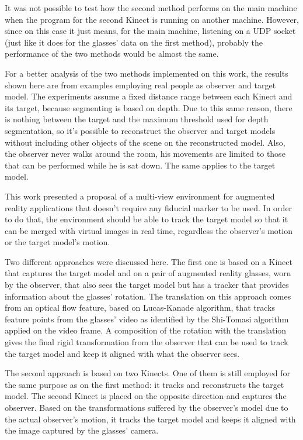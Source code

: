 \documentclass[msc, a4paper, classic, en]{ufbathesis}
\begin{document}
It was not possible to test how the second method performs on the main machine when the program for the second Kinect is running on another machine. However, since on this case it just means, for the main machine, listening on a UDP socket (just like it does for the glasses' data on the first method), probably the performance of the two methods would be almost the same.

For a better analysis of the two methods implemented on this work, the results shown here are from examples employing real people as observer and target model. The experiments assume a fixed distance range between each Kinect and its target, because segmenting is based on depth. Due to this same reason, there is nothing between the target and the maximum threshold used for depth segmentation, so it's possible to reconstruct the observer and target models without including other objects of the scene on the reconstructed model. Also, the observer never walks around the room, his movements are limited to those that can be performed while he is sat down. The same applies to the target model.


This work presented a proposal of a multi-view environment for augmented reality applications that doesn't require any fiducial marker to be used. In order to do that, the environment should be able to track the target model so that it can be merged with virtual images in real time, regardless the observer's motion or the target model's motion.

Two different approaches were discussed here. The first one is based on a Kinect that captures the target model and on a pair of augmented reality glasses, worn by the observer, that also sees the target model but has a tracker that provides information about the glasses' rotation. The translation on this approach comes from an optical flow feature, based on Lucas-Kanade algorithm, that tracks feature points from the glasses' video as identified by the Shi-Tomasi algorithm applied on the video frame. A composition of the rotation with the translation gives the final rigid transformation from the observer that can be used to track the target model and keep it aligned with what the observer sees.

The second approach is based on two Kinects. One of them is still employed for the same purpose as on the first method: it tracks and reconstructs the target model. The second Kinect is placed on the opposite direction and captures the observer. Based on the transformations suffered by the observer's model due to the actual observer's motion, it tracks the target model and keeps it aligned with the image captured by the glasses' camera.
\end{document}
